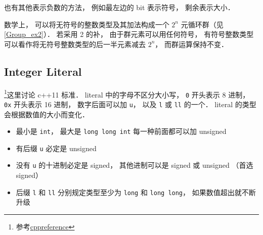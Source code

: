 也有其他表示负数的方法， 例如最左边的 bit 表示符号， 剩余表示大小．

数学上， 可以将无符号的整数类型及其加法构成一个 $2^n$ 元循环群（见\autoref{Group_ex2}）． 若采用 2 的补， 由于群元素可以用任何符号， 有符号整数类型可以看作将无符号整数类型的后一半元素减去 $2^n$， 而群运算保持不变．

\subsection{Integer Literal}
\footnote{参考\href{https://en.cppreference.com/w/cpp/language/integer_literal}{cppreference}}这里讨论 c++11 标准． literal 中的字母不区分大小写， \verb|0| 开头表示 8 进制，  \verb|0x| 开头表示 16 进制， 数字后面可以加 \verb|u|， 以及 \verb|l| 或 \verb|ll| 的一个． literal 的类型会根据数值的大小而变化．

\begin{itemize}
\item 最小是 \verb|int|， 最大是 \verb|long long int| 每一种前面都可以加 unsigned
\item 有后缀 \verb|u| 必定是 unsigned
\item 没有 \verb|u| 的十进制必定是 signed， 其他进制可以是 signed 或 unsigned （首选 signed）
\item 后缀 \verb|l| 和 \verb|ll| 分别规定类型至少为 \verb|long| 和 \verb|long long|， 如果数值超出就不断升级
\end{itemize}
